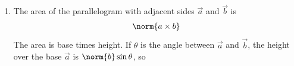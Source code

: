 \begin{enumerate}[label=\thesubsection.\arabic*, ref=\thesubsection.\theenumi]
\begin{align}
	\vec{a}\times\vec{b} = \myvec{a_2b_3 - a_3b_2 \\ a_3b_1 - a_1b_3 \\ a_1b_2 - a_2b_1} \label{eq:EE26BTECH11205-cross-comp}
\end{align}
\solution With $\hat{\imath} = \myvec{1 \\ 0 \\ 0}$, $\hat{\jmath} = \myvec{0 \\ 1 \\ 0}$ and $\hat{k} = \myvec{0 \\ 0 \\ 1}$, \eqref{eq:EE26BTECH11205-cross-comp} gives
\begin{align}
	\hat{\imath}\times\hat{\jmath} &= \myvec{0\cdot 0 - 0\cdot 1 \\ 0\cdot 0 - 1\cdot 0 \\ 1\cdot 1 - 0\cdot 0} \notag
	\\
	&= \myvec{0 \\ 0 \\ 1} \notag
	\\
	&= \hat{k} \notag
	\\
	\hat{\jmath}\times\hat{k} &= \myvec{1\cdot 1 - 0\cdot 0 \\ 0\cdot 0 - 0\cdot 1 \\ 0\cdot 0 - 1\cdot 0} \notag
	\\
	&= \myvec{1 \\ 0 \\ 0} \notag
	\\
	&= \hat{\imath} \notag
	\\
	\hat{k}\times\hat{\imath} &= \myvec{0\cdot 0 - 1\cdot 0 \\ 1\cdot 1 - 0\cdot 0 \\ 0\cdot 0 - 0\cdot 1} \notag
	\\
	&= \myvec{0 \\ 1 \\ 0} \notag
	\\
	&= \hat{\jmath}
\end{align}
Each of $\hat{\imath},\hat{\jmath},\hat{k}$ is a unit vector, so $\hat{\imath}\cdot\hat{\imath} = \hat{\jmath}\cdot\hat{\jmath} = \hat{k}\cdot\hat{k} = 1$.
\item The area of the parallelogram with adjacent sides $\vec{a}$ and $\vec{b}$ is
\begin{align}
	\norm{\vec{a}\times\vec{b}} \label{eq:EE26BTECH11205-area-cross}
\end{align}
\solution The area is base times height. If $\theta$ is the angle between $\vec{a}$ and $\vec{b}$, the height over the base $\vec{a}$ is $\norm{\vec{b}}\sin\theta$, so

\end{enumerate}
